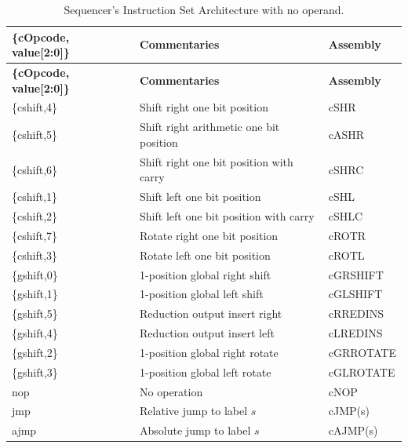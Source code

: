 \begin{table}[H]
\small
\centering
\begin{longtable}{|l|l|l|}
\caption{Sequencer's Instruction Set Architecture with no operand.}
\label{tab:sequencer_isa} \\
\hline
\textbf{\{cOpcode, value[2:0]\}} & \textbf{Commentaries}                         & \textbf{Assembly}    \\
\hline
\endfirsthead
\hline
\textbf{\{cOpcode, value[2:0]\}} & \textbf{Commentaries}                         & \textbf{Assembly}    \\
\hline
\endhead
\hline
\endfoot
\hline
\endlastfoot
\{cshift,4\}   & Shift right one bit position                  & cSHR         \\ \hline
\{cshift,5\}   & Shift right arithmetic one bit position       & cASHR        \\ \hline
\{cshift,6\}   & Shift right one bit position with carry       & cSHRC        \\ \hline
\{cshift,1\}   & Shift left one bit position                   & cSHL         \\ \hline
\{cshift,2\}   & Shift left one bit position with carry        & cSHLC        \\ \hline
\{cshift,7\}   & Rotate right one bit position                 & cROTR        \\ \hline
\{cshift,3\}   & Rotate left one bit position                  & cROTL        \\ \hline
\{gshift,0\}   & 1-position global right shift                 & cGRSHIFT     \\ \hline
\{gshift,1\}   & 1-position global left shift                  & cGLSHIFT     \\ \hline
\{gshift,5\}   & Reduction output insert right                 & cRREDINS     \\ \hline
\{gshift,4\}   & Reduction output insert left                  & cLREDINS     \\ \hline
\{gshift,2\}   & 1-position global right rotate                & cGRROTATE    \\ \hline
\{gshift,3\}   & 1-position global left rotate                 & cGLROTATE    \\ \hline
nop            & No operation                                  & cNOP         \\ \hline
jmp            & Relative jump to label \(s\)                 & cJMP(s)      \\ \hline
ajmp           & Absolute jump to label \(s\)                 & cAJMP(s)     \\ \hline

\end{longtable}
\end{table}
